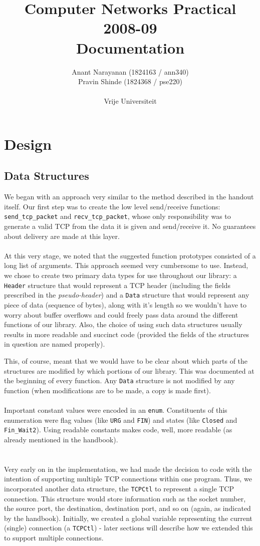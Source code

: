 \documentclass{article}
\author{Anant Narayanan (1824163 / ann340)\\
	Pravin Shinde (1824368 / pse220)\\
	\\
	Vrije Universiteit\\
}
\title{Computer Networks Practical 2008-09\\
Documentation}
\begin{document}
\maketitle

\section{Design}
\subsection{Data Structures}
We began with an approach very similar to the method described in the handout itself. Our first step was to create the low level send/receive functions: \texttt{send\_tcp\_packet} and \texttt{recv\_tcp\_packet}, whose only responsibility was to generate a valid TCP from the data it is given and send/receive it. No guarantees about delivery are made at this layer.
\\
\\
At this very stage, we noted that the suggested function prototypes consisted of a long list of arguments. This approach seemed very cumbersome to use. Instead, we chose to create two primary data types for use throughout our library: a \texttt{Header} structure that would represent a TCP header (including the fields prescribed in the \textit{pseudo-header}) and a \texttt{Data} structure that would represent any piece of data (sequence of bytes), along with it's length so we wouldn't have to worry about buffer overflows and could freely pass data around the different functions of our library. Also, the choice of using such data structures usually results in more readable and succinct code (provided the fields of the structures in question are named properly).

This, of course, meant that we would have to be clear about which parts of the structures are modified by which portions of our library. This was documented at the beginning of every function. Any \texttt{Data} structure is not modified by any function (when modifications are to be made, a copy is made first).
\\
\\
Important constant values were encoded in an \texttt{enum}. Constituents of this enumeration were flag values (like \texttt{URG} and \texttt{FIN}) and states (like \texttt{Closed} and \texttt{Fin\_Wait2}). Using readable constants makes  code, well, more readable (as already mentioned in the handbook).
\\
\\
\\
Very early on in the implementation, we had made the decision to code with the intention of supporting multiple TCP connections within one program. Thus, we incorporated another data structure, the \texttt{TCPCtl} to represent a single TCP connection. This structure would store information such as the socket number, the source port, the destination, destination port, and so on (again, as indicated by the handbook). Initially, we created a global variable representing the current (single) connection (a \texttt{TCPCtl}) - later sections will describe how we extended this to support multiple connections.
\end{document}
